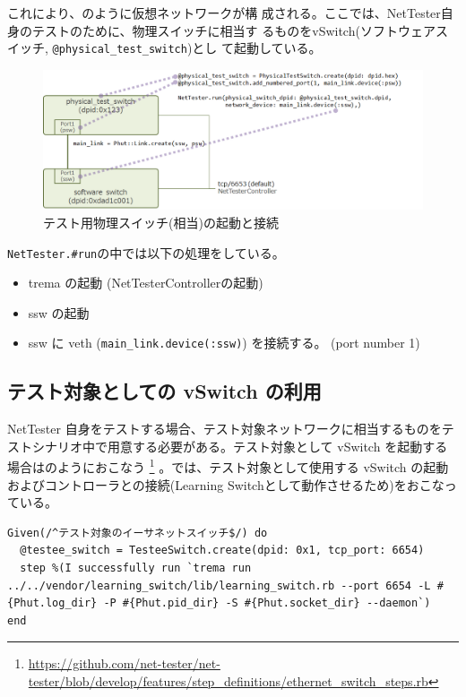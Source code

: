 これにより、のように仮想ネットワークが構
成される。ここでは、NetTester自身のテストのために、物理スイッチに相当す
るものをvSwitch(ソフトウェアスイッチ, \verb|@physical_test_switch|)とし
て起動している。

\begin{figure}[h]
 \centering
 \includegraphics[scale=0.6]{img/phut-psw-ssw-model.png}
 \caption{テスト用物理スイッチ(相当)の起動と接続}
 \label{fig:phut-psw-ssw-model}
\end{figure}

\verb|NetTester.#run|の中では以下の処理をしている。

\begin{itemize}
 \item trema の起動 (NetTesterControllerの起動)
 \item ssw の起動
 \item ssw に veth (\verb|main_link.device(:ssw)|) を接続する。
       (port number 1)
\end{itemize}

\subsection{テスト対象としての vSwitch の利用}

NetTester 自身をテストする場合、テスト対象ネットワークに相当するものをテ
ストシナリオ中で用意する必要がある。テスト対象として vSwitch を起動する
場合はのようにおこなう
\footnote{\url{https://github.com/net-tester/net-tester/blob/develop/features/step_definitions/ethernet_switch_steps.rb}}
。では、テスト対象として使用する vSwitch の起動
およびコントローラとの接続(Learning Switchとして動作させるため)をおこなっ
ている。

\begin{lstlisting}[caption=vSwitchの起動,label=lst:run-vswitch]
Given(/^テスト対象のイーサネットスイッチ$/) do
  @testee_switch = TesteeSwitch.create(dpid: 0x1, tcp_port: 6654)
  step %(I successfully run `trema run ../../vendor/learning_switch/lib/learning_switch.rb --port 6654 -L #{Phut.log_dir} -P #{Phut.pid_dir} -S #{Phut.socket_dir} --daemon`)
end
\end{lstlisting}

